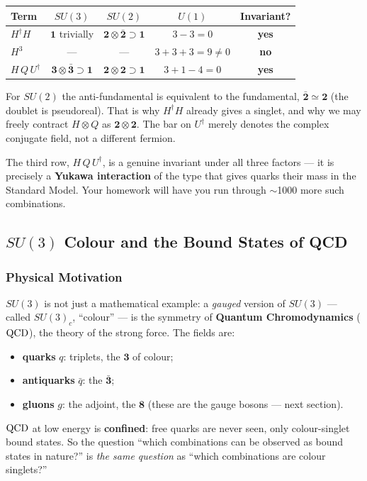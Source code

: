 \documentclass[../main.tex]{subfiles}
\begin{document}
\begin{center}
\renewcommand{\arraystretch}{1.3}
\begin{tabular}{lcccc}
  \toprule
  Term & $SU(3)$ & $SU(2)$ & $U(1)$ & Invariant? \\
  \midrule
  $H^\dagger H$ & $\mathbf{1}$ trivially & $\mathbf{2}\otimes\bar{\mathbf{2}}\supset\mathbf{1}$ & $3-3=0$ & \textbf{yes} \\
  $H^3$ & --- & --- & $3+3+3=9\neq0$ & \textbf{no} \\
  $H\,Q\,U^\dagger$ & $\mathbf{3}\otimes\bar{\mathbf{3}}\supset\mathbf{1}$ & $\mathbf{2}\otimes\mathbf{2}\supset\mathbf{1}$ & $3+1-4=0$ & \textbf{yes} \\
  \bottomrule
\end{tabular}
\end{center}

\begin{note}
For $SU(2)$ the anti-fundamental is equivalent to the fundamental, $\bar{\mathbf{2}}\simeq\mathbf{2}$ (the doublet is pseudoreal). That is why $H^\dagger H$ already gives a singlet, and why we may freely contract $H\otimes Q$ as $\mathbf{2}\otimes\mathbf{2}$. The bar on $U^\dagger$ merely denotes the complex conjugate field, not a different fermion.
\end{note}

The third row, $H\,Q\,U^\dagger$, is a genuine invariant under all three factors --- it is precisely a \textbf{Yukawa interaction} of the type that gives quarks their mass in the Standard Model. Your homework will have you run through $\sim$1000 more such combinations.

\subsection{$SU(3)$ Colour and the Bound States of QCD}\label{sec:lec13:qcd}

\subsubsection*{Physical Motivation}

$SU(3)$ is not just a mathematical example: a \emph{gauged} version of $SU(3)$ --- called $SU(3)_c$, ``colour'' --- is the symmetry of \textbf{Quantum Chromodynamics} ($\mathrm{QCD}$), the theory of the strong force. The fields are:
\begin{itemize}
  \item \textbf{quarks} $q$: triplets, the $\mathbf{3}$ of colour;
  \item \textbf{antiquarks} $\bar q$: the $\bar{\mathbf{3}}$;
  \item \textbf{gluons} $g$: the adjoint, the $\mathbf{8}$ (these are the gauge bosons --- next section).
\end{itemize}
$\mathrm{QCD}$ at low energy is \textbf{confined}: free quarks are never seen, only colour-singlet bound states. So the question ``which combinations can be observed as bound states in nature?'' is \emph{the same question} as ``which combinations are colour singlets?''
\end{document}
